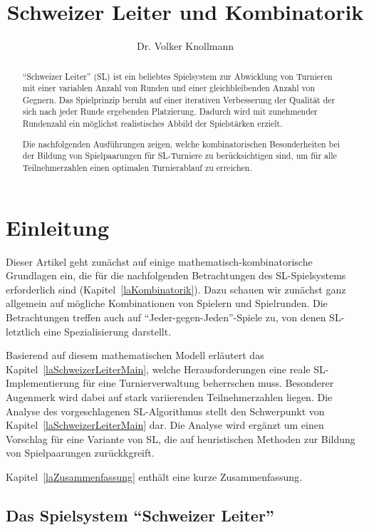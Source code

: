 \documentclass[DIV=15, 10pt]{scrartcl}
\begin{document}
\title{Schweizer Leiter und Kombinatorik}
\author{Dr. Volker Knollmann}

\maketitle

\begin{abstract}
"`Schweizer Leiter"' (SL) ist ein beliebtes Spielsystem zur Abwicklung von Turnieren mit einer variablen Anzahl von Runden und einer gleichbleibenden Anzahl von Gegnern. Das Spielprinzip beruht auf einer iterativen Verbesserung der Qualität der sich nach jeder Runde ergebenden Platzierung. Dadurch wird mit zunehmender Rundenzahl ein möglichst realistisches Abbild der Spielstärken erzielt.

Die nachfolgenden Ausführungen zeigen, welche kombinatorischen Besonderheiten bei der Bildung von Spielpaarungen für SL-Turniere zu berücksichtigen sind, um für alle Teilnehmerzahlen einen optimalen Turnierablauf zu erreichen.
\end{abstract}

\section{Einleitung}

Dieser Artikel geht zunächst auf einige mathematisch-kombinatorische Grundlagen ein,
die für die nachfolgenden Betrachtungen des SL-Spielsystems erforderlich sind (Kapitel~\ref{laKombinatorik}). Dazu
schauen wir zunächst ganz allgemein auf mögliche Kombinationen von Spielern und Spielrunden. Die Betrachtungen treffen auch auf "`Jeder-gegen-Jeden"'-Spiele zu, von denen SL-letztlich eine Spezialisierung darstellt.

Basierend auf diesem mathematischen Modell erläutert das Kapitel~\ref{laSchweizerLeiterMain}, welche Herausforderungen
eine reale SL-Implementierung für eine Turnierverwaltung beherrschen muss. Besonderer Augenmerk
wird dabei auf stark variierenden Teilnehmerzahlen liegen. Die Analyse des vorgeschlagenen SL-Algorithmus stellt den Schwerpunkt von Kapitel~\ref{laSchweizerLeiterMain} dar. Die Analyse wird ergänzt um einen Vorschlag für eine Variante von SL, die auf heuristischen Methoden zur Bildung von Spielpaarungen zurückkgreift.

Kapitel~\ref{laZusammenfassung} enthält eine kurze Zusammenfassung.

\subsection{Das Spielsystem "`Schweizer Leiter"'}
\end{document}
